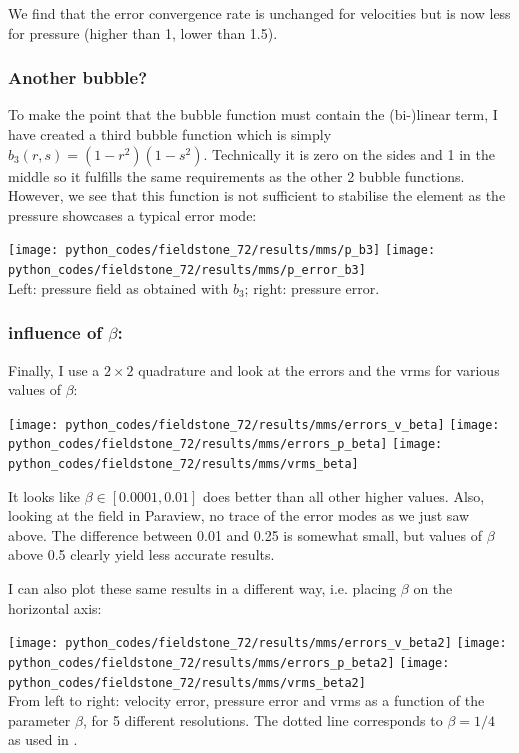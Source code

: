 We find that the error convergence rate is unchanged for velocities but is now less 
for pressure (higher than 1, lower than 1.5). 

\subsubsection{Another bubble?} 
To make the point that the bubble function must contain the (bi-)linear term, 
I have created a third bubble function which is simply $b_3(r,s)=(1-r^2)(1-s^2)$.
Technically it is zero on the sides and 1 in the middle so it fulfills the 
same requirements as the other 2 bubble functions. 
However, we see that this function is not sufficient to stabilise the element as the pressure 
showcases a typical error mode:
\begin{center}
\texttt{[image: python\_codes/fieldstone\_72/results/mms/p\_b3]}
\texttt{[image: python\_codes/fieldstone\_72/results/mms/p\_error\_b3]}\\
{\captionfont Left: pressure field as obtained with $b_3$; right: pressure error.}
\end{center}


\subsubsection{influence of $\beta$:} Finally, 
I use a $2\times 2$ quadrature and look at 
the errors and the vrms for various values of $\beta$:
\begin{center}
\texttt{[image: python\_codes/fieldstone\_72/results/mms/errors\_v\_beta]}
\texttt{[image: python\_codes/fieldstone\_72/results/mms/errors\_p\_beta]}
\texttt{[image: python\_codes/fieldstone\_72/results/mms/vrms\_beta]}
\end{center}
It looks like $\beta\in[0.0001,0.01]$ does better than all other higher values. 
Also, looking at the 
field in Paraview, no trace of the error modes as we just saw above.
The difference between 0.01 and 0.25 is somewhat small, but values of $\beta$ above 0.5 
clearly yield less accurate results. 

I can also plot these same results in a different way, i.e. placing $\beta$ on the horizontal axis:

\begin{center}
\texttt{[image: python\_codes/fieldstone\_72/results/mms/errors\_v\_beta2]}
\texttt{[image: python\_codes/fieldstone\_72/results/mms/errors\_p\_beta2]}
\texttt{[image: python\_codes/fieldstone\_72/results/mms/vrms\_beta2]}\\
{\captionfont From left to right: velocity error, pressure error and vrms as a function 
of the parameter $\beta$, for 5 different resolutions. The dotted line corresponds to $\beta=1/4$ as used in \cite{lami17}.}
\end{center}

